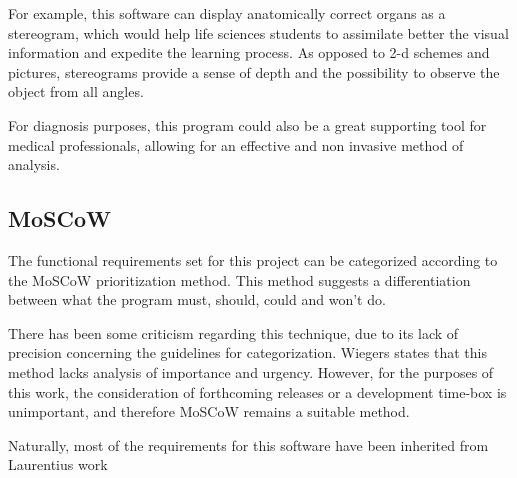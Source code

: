 \documentclass[12pt]{extarticle}
\begin{document}
For example, this software can display anatomically correct organs as a stereogram, which would help life sciences students to assimilate better the visual information and expedite the learning process. As opposed to 2-d schemes and pictures, stereograms provide a sense of depth and the possibility to observe the object from all angles.

For diagnosis purposes, this program could also be a great supporting tool for medical professionals, allowing for an effective and non invasive method of analysis.

\subsection{MoSCoW}
The functional requirements set for this project can be categorized according to the MoSCoW \cite{Moscow} prioritization method. This method suggests a differentiation between what the program must, should, could and won\rq{}t do.

There has been some criticism regarding this technique, due to its lack of precision concerning the guidelines for categorization. Wiegers \cite{Wiegers} states that this method lacks analysis of importance and urgency. However, for the purposes of this work, the consideration of forthcoming releases or a development time-box is unimportant, and therefore MoSCoW remains a suitable method.

Naturally, most of the requirements for this software have been inherited from Laurentius work \cite{AV}
\end{document}
